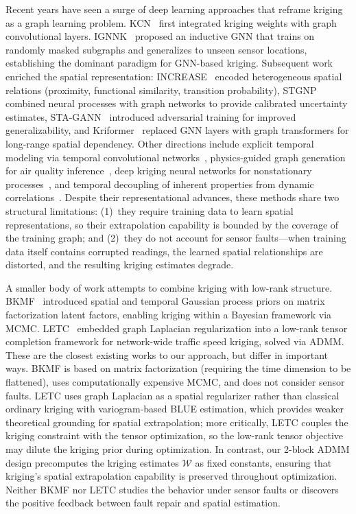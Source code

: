 \documentclass[journal]{IEEEtran}
\newcommand{\Wcal}{\mathcal{W}}
\begin{document}
Recent years have seen a surge of deep learning approaches that reframe kriging as a graph learning problem. KCN~\cite{appleby2020kcn} first integrated kriging weights with graph convolutional layers. IGNNK~\cite{wu2021ignnk} proposed an inductive GNN that trains on randomly masked subgraphs and generalizes to unseen sensor locations, establishing the dominant paradigm for GNN-based kriging. Subsequent work enriched the spatial representation: INCREASE~\cite{zheng2023increase} encoded heterogeneous spatial relations (proximity, functional similarity, transition probability), STGNP~\cite{hu2023stgnp} combined neural processes with graph networks to provide calibrated uncertainty estimates, STA-GANN~\cite{li2025stagann} introduced adversarial training for improved generalizability, and Kriformer~\cite{pan2024kriformer} replaced GNN layers with graph transformers for long-range spatial dependency. Other directions include explicit temporal modeling via temporal convolutional networks~\cite{wu2021satcn}, physics-guided graph generation for air quality inference~\cite{yang2025physics}, deep kriging neural networks for nonstationary processes~\cite{liu2025stkrigingnet}, and temporal decoupling of inherent properties from dynamic correlations~\cite{zhou2026track}. Despite their representational advances, these methods share two structural limitations: (1)~they require training data to learn spatial representations, so their extrapolation capability is bounded by the coverage of the training graph; and (2)~they do not account for sensor faults---when training data itself contains corrupted readings, the learned spatial relationships are distorted, and the resulting kriging estimates degrade.

A smaller body of work attempts to combine kriging with low-rank structure. BKMF~\cite{lei2022bkmf} introduced spatial and temporal Gaussian process priors on matrix factorization latent factors, enabling kriging within a Bayesian framework via MCMC. LETC~\cite{nie2023letc} embedded graph Laplacian regularization into a low-rank tensor completion framework for network-wide traffic speed kriging, solved via ADMM. These are the closest existing works to our approach, but differ in important ways. BKMF is based on matrix factorization (requiring the time dimension to be flattened), uses computationally expensive MCMC, and does not consider sensor faults. LETC uses graph Laplacian as a spatial regularizer rather than classical ordinary kriging with variogram-based BLUE estimation, which provides weaker theoretical grounding for spatial extrapolation; more critically, LETC couples the kriging constraint with the tensor optimization, so the low-rank tensor objective may dilute the kriging prior during optimization. In contrast, our 2-block ADMM design precomputes the kriging estimates $\Wcal$ as fixed constants, ensuring that kriging's spatial extrapolation capability is preserved throughout optimization. Neither BKMF nor LETC studies the behavior under sensor faults or discovers the positive feedback between fault repair and spatial estimation.
\end{document}
